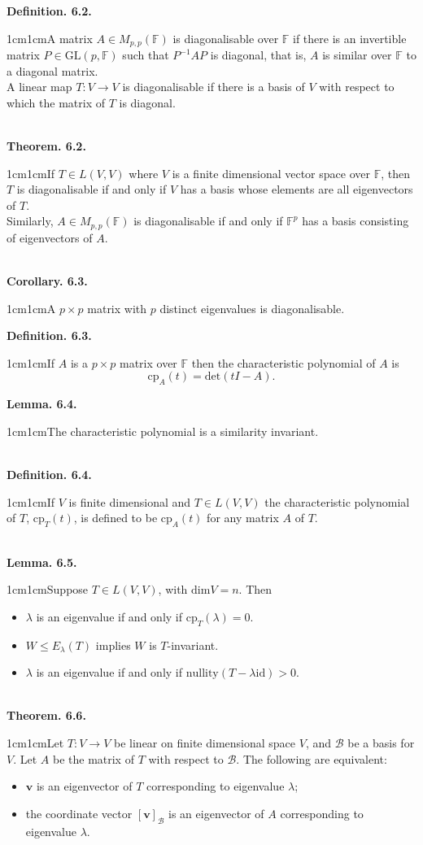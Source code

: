 \documentclass{article}
\newcommand{\vect}[1]{\mathbf{#1}}
\newcommand{\definition}[2]{\textbf{Definition. #1.}\begin{adjustwidth}{1cm}{1cm}#2\end{adjustwidth}}
\newcommand{\theorem}[2]{\textbf{Theorem. #1.}\begin{adjustwidth}{1cm}{1cm}#2\end{adjustwidth}}
\newcommand{\lemma}[2]{\textbf{Lemma. #1.}\begin{adjustwidth}{1cm}{1cm}#2\end{adjustwidth}}
\newcommand{\corollary}[2]{\textbf{Corollary. #1.}\begin{adjustwidth}{1cm}{1cm}#2\end{adjustwidth}}
\begin{document}
\definition{6.2}{A matrix $A \in M_{p,p}(\mathbb{F})$ is diagonalisable over $\mathbb{F}$ if there is an invertible matrix $P \in \text{GL}(p, \mathbb{F})$ such that $P^{-1}AP$ is diagonal, that is, $A$ is similar over $\mathbb{F}$ to a diagonal matrix.\\A linear map $T: V \rightarrow V$ is diagonalisable if there is a basis of $V$ with respect to which the matrix of $T$ is diagonal.}~\\
\theorem{6.2}{If $T \in L(V,V)$ where $V$ is a finite dimensional vector space over $\mathbb{F}$, then $T$ is diagonalisable if and only if $V$ has a basis whose elements are all eigenvectors of $T$.\\Similarly, $A \in M_{p,p}(\mathbb{F})$ is diagonalisable if and only if $\mathbb{F}^p$ has a basis consisting of eigenvectors of $A$.}~\\
\corollary{6.3}{A $p \times p$ matrix with $p$ distinct eigenvalues is diagonalisable.}\newpage
\definition{6.3}{If $A$ is a $p \times p$ matrix over $\mathbb{F}$ then the characteristic polynomial of $A$ is \[\text{cp}_A(t) = \text{det}(tI - A).\]}
\lemma{6.4}{The characteristic polynomial is a similarity invariant.}~\\
\definition{6.4}{If $V$ is finite dimensional and $T \in L(V,V)$ the characteristic polynomial of $T$, $\text{cp}_T(t)$, is defined to be $\text{cp}_A(t)$ for any matrix $A$ of $T$.}~\\
\lemma{6.5}{Suppose $T \in L(V,V)$, with $\text{dim}V = n$. Then
\begin{itemize}
  \item $\lambda$ is an eigenvalue if and only if $\text{cp}_T(\lambda) = 0$.
  \item $W \leq E_\lambda(T)$ implies $W$ is $T$-invariant.
  \item $\lambda$ is an eigenvalue if and only if $\text{nullity}(T - \lambda \text{id}) > 0$.
\end{itemize}}~\\
\theorem{6.6}{Let $T: V \rightarrow V$ be linear on finite dimensional space $V$, and $\mathcal{B}$ be a basis for $V$. Let $A$ be the matrix of $T$ with respect to $\mathcal{B}$. The following are equivalent:
\begin{itemize}
  \item $\vect{v}$ is an eigenvector of $T$ corresponding to eigenvalue $\lambda$;
  \item the coordinate vector $[\vect{v}]_\mathcal{B}$ is an eigenvector of $A$ corresponding to eigenvalue $\lambda$.
\end{itemize}}~\\
\end{document}
